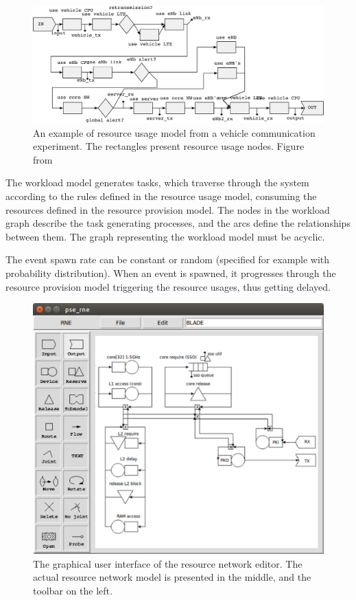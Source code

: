 \begin{figure}[]
  \begin{center}
    \includegraphics[width=\textwidth]{images/pse-models/pse-tg-example.pdf}
    \caption{An example of resource usage model from a vehicle communication experiment. The rectangles present resource usage nodes. Figure from~\cite{TODO: cite PSE manual}}
    \label{fig:resource-usage-model}
  \end{center}
\end{figure}

The workload model generates tasks, which traverse through the system according to the rules defined in the resource usage model, consuming the resources defined in the resource provision model. The nodes in the workload graph describe the task generating processes, and the arcs define the relationships between them. The graph representing the workload model must be acyclic.

The event spawn rate can be constant or random (specified for example with probability distribution). When an event is spawned, it progresses through the resource provision model triggering the resource usages, thus getting delayed.

\begin{figure}[]
  \begin{center}
    \includegraphics[width=\textwidth]{images/rne-example.pdf}
    \caption{The graphical user interface of the resource network editor. The actual resource network model is presented in the middle, and the toolbar on the left.}
    \label{fig:rne-example}
  \end{center}
\end{figure}

